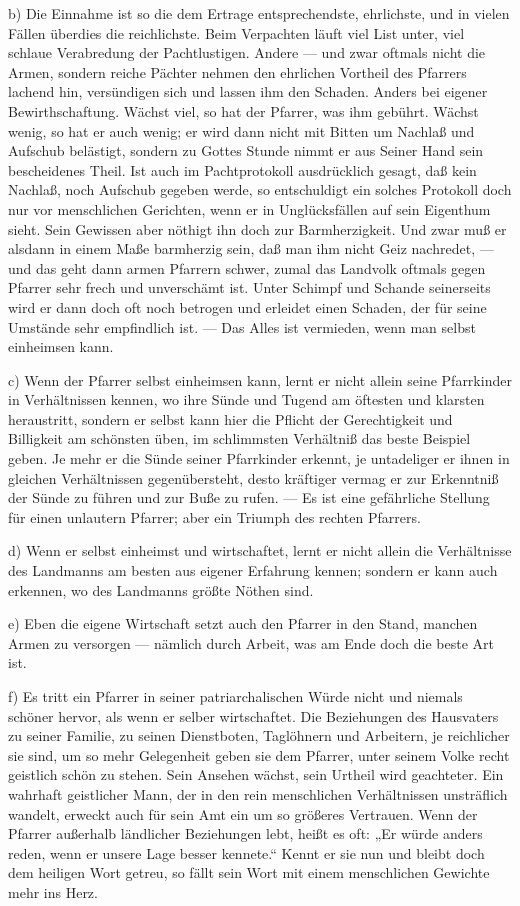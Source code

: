 b) Die Einnahme ist so die dem Ertrage entsprechendste, ehrlichste, und in vielen Fällen überdies die reichlichste. Beim Verpachten läuft viel List unter, viel schlaue Verabredung der Pachtlustigen. Andere — und zwar oftmals nicht die Armen, sondern reiche Pächter nehmen den ehrlichen Vortheil des Pfarrers lachend hin, versündigen sich und lassen ihm den Schaden. Anders bei eigener Bewirthschaftung. Wächst viel, so hat der Pfarrer, was ihm gebührt. Wächst wenig, so hat er auch wenig; er wird dann nicht mit Bitten um Nachlaß und Aufschub belästigt, sondern zu Gottes Stunde nimmt er aus Seiner Hand sein bescheidenes Theil. Ist auch im
Pachtprotokoll ausdrücklich gesagt, daß kein Nachlaß, noch Aufschub gegeben werde, so entschuldigt ein solches Protokoll doch nur vor menschlichen Gerichten, wenn er in Unglücksfällen auf sein Eigenthum sieht. Sein Gewissen aber nöthigt ihn doch zur Barmherzigkeit. Und zwar muß er alsdann in einem Maße barmherzig sein, daß man ihm nicht Geiz nachredet, — und das geht dann armen Pfarrern schwer, zumal das Landvolk oftmals gegen Pfarrer sehr frech und unverschämt ist. Unter Schimpf und Schande seinerseits wird er dann doch oft noch betrogen und erleidet einen Schaden, der für seine Umstände sehr empfindlich ist. — Das Alles ist vermieden, wenn man selbst einheimsen kann.

c) Wenn der Pfarrer selbst einheimsen kann, lernt er nicht allein seine Pfarrkinder in Verhältnissen kennen, wo ihre Sünde und Tugend am öftesten und klarsten heraustritt, sondern er selbst kann hier die Pflicht der Gerechtigkeit und Billigkeit am schönsten üben, im schlimmsten Verhältniß das beste Beispiel geben. Je mehr er die Sünde seiner Pfarrkinder erkennt, je untadeliger er ihnen in gleichen Verhältnissen gegenübersteht, desto kräftiger vermag er zur Erkenntniß der Sünde zu führen und zur Buße zu rufen. — Es ist eine gefährliche Stellung für einen unlautern Pfarrer; aber ein Triumph des rechten Pfarrers.

d) Wenn er selbst einheimst und wirtschaftet, lernt er nicht allein die Verhältnisse des Landmanns am besten aus eigener Erfahrung kennen; sondern er kann auch
erkennen, wo des Landmanns größte Nöthen sind.

e) Eben die eigene Wirtschaft setzt auch den Pfarrer in den Stand, manchen Armen zu versorgen — nämlich durch Arbeit, was am Ende doch die beste Art ist.

f) Es tritt ein Pfarrer in seiner patriarchalischen Würde nicht und niemals schöner hervor, als wenn er selber wirtschaftet. Die Beziehungen des Hausvaters zu seiner Familie, zu seinen Dienstboten, Taglöhnern und Arbeitern, je reichlicher sie sind, um so mehr Gelegenheit geben sie dem Pfarrer, unter seinem Volke recht geistlich schön zu stehen. Sein Ansehen wächst, sein Urtheil wird geachteter. Ein wahrhaft geistlicher Mann, der in den rein menschlichen Verhältnissen unsträflich wandelt, erweckt auch für sein Amt ein um so größeres Vertrauen. Wenn der Pfarrer außerhalb ländlicher Beziehungen lebt, heißt es oft: „Er würde anders reden, wenn er unsere Lage besser kennete.“ Kennt er sie nun und bleibt doch dem heiligen Wort getreu, so fällt sein Wort mit einem menschlichen Gewichte mehr ins Herz.

